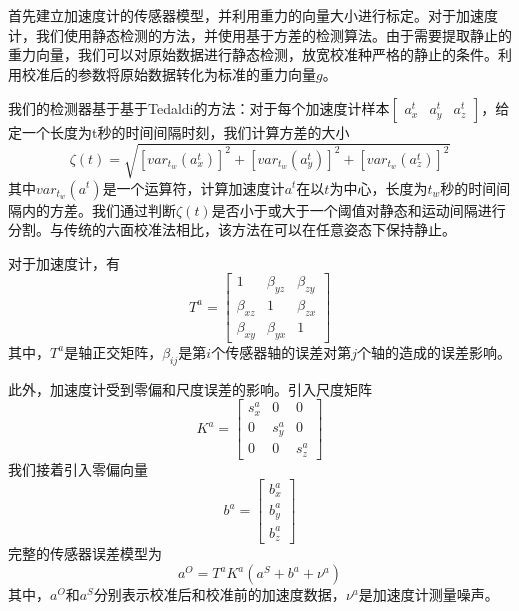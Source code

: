 \documentclass[
  type=master
]{gdutthesis}
\begin{document}
首先建立加速度计的传感器模型，并利用重力的向量大小进行标定\cite{jekeli2012inertial}。对于加速度计，我们使用静态检测的方法\cite{fong2008methods}，并使用基于方差的检测算法\cite{sabatini2006wavelet}。由于需要提取静止的重力向量，我们可以对原始数据进行静态检测，放宽校准种严格的静止的条件。利用校准后的参数将原始数据转化为标准的重力向量$g$。\par
我们的检测器基于基于Tedaldi的方法：对于每个加速度计样本$\begin{bmatrix}
	a^t_x & a^t_y & a^t_z
\end{bmatrix}$，给定一个长度为t秒的时间间隔时刻，我们计算方差的大小
\begin{equation}\label{eq:var}
	\zeta(t)=\sqrt{[var_{t_w}(a^t_x)]^2+[var_{t_w}(a^t_y)]^2+[var_{t_w}(a^t_z)]^2}
\end{equation}
其中$var_{t_w}(a^t)$是一个运算符，计算加速度计$a^t$在以$t$为中心，长度为$t_w$秒的时间间隔内的方差。我们通过判断$\zeta(t)$是否小于或大于一个阈值对静态和运动间隔进行分割。与传统的六面校准法相比\cite{尹杭2014一种}，该方法在可以在任意姿态下保持静止。

对于加速度计，有
\begin{equation}\label{eq:axiserror}
	T^{a}=
	\begin{bmatrix}
		1 & \beta_{yz} & \beta_{zy}\\
		\beta_{xz} & 1 & \beta_{zx}\\
		\beta_{xy} & \beta_{yx} & 1
	\end{bmatrix}
\end{equation}
其中，$T^a$是轴正交矩阵，$\beta_{ij}$是第$i$个传感器轴的误差对第$j$个轴的造成的误差影响。\par
此外，加速度计受到零偏和尺度误差的影响。引入尺度矩阵
\begin{equation}\label{eq:scaleerror}
	K^{a}=
	\begin{bmatrix}
		s^a_x & 0 & 0\\
		0 & s^a_y & 0\\
		0 & 0 & s^a_z
	\end{bmatrix}
\end{equation}
我们接着引入零偏向量
\begin{equation}\label{eq:scaleerror}
	b^{a}=
	\begin{bmatrix}
		b^a_x\\
		b^a_y\\
		b^a_z
	\end{bmatrix}
\end{equation}
完整的传感器误差模型为
\begin{equation}\label{eq:sensorerrormodel}
	a^O=T^a K^a (a^S + b^a + \nu^a)
\end{equation}
其中，$a^O$和$a^S$分别表示校准后和校准前的加速度数据，$ν^a$是加速度计测量噪声。
\end{document}
